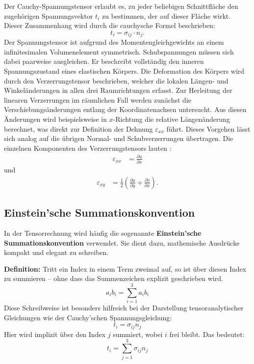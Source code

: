 Der Cauchy-Spannungstensor erlaubt es, zu jeder beliebigen Schnittfläche den zugehörigen Spannungsvektor $t_i$ zu bestimmen, der auf dieser Fläche wirkt.
Dieser Zusammenhang wird durch die cauchysche Formel beschrieben:
	\begin{equation}
		t_i = 
		\sigma_{ij} \cdot n_j.
	\end{equation}
Der Spannungstensor ist aufgrund des Momentengleichgewichts an einem infinitesimalen Volumenelement symmetrisch. 
Schubspannungen müssen sich dabei paarweise ausgleichen. 
Er beschreibt vollständig den inneren Spannungszustand eines elastischen Körpers.
Die Deformation des Körpers wird durch den Verzerrungstensor beschrieben, welcher die lokalen Längen- und Winkeländerungen in allen drei Raumrichtungen erfasst.
Zur Herleitung der linearen Verzerrungen im räumlichen Fall werden zunächst die Verschiebungsänderungen entlang der Koordinatenachsen untersucht. 
Aus diesen Änderungen wird beispielsweise in $x$-Richtung die relative Längenänderung berechnet, was direkt zur Definition der Dehnung $\varepsilon_{xx}$ führt. 
Dieses Vorgehen lässt sich analog auf die übrigen Normal- und Schubverzerrungen übertragen.
Die einzelnen Komponenten des Verzerrungstensors lauten \cite{elastomechanik:Technische_Mechanik_2:Elastostatik}:
\begin{align}
	\varepsilon_{xx} &=
	\frac{\partial u}{\partial x}
\end{align}
und
\begin{align}
	\varepsilon_{xy} &=
	\frac{1}{2} \left( \frac{\partial u}{\partial y} + \frac{\partial v}{\partial x} \right).
\end{align}

\subsection{Einstein’sche Summationskonvention}
In der Tensorrechnung wird häufig die sogenannte \textbf{Einstein’sche Summationskonvention} verwendet. Sie dient dazu, mathemische Ausdrücke kompakt und elegant zu schreiben.

\medskip
\textbf{Definition:} Tritt ein Index in einem Term zweimal auf, so ist über diesen Index zu summieren – ohne dass das Summenzeichen explizit geschrieben wird.
	\begin{equation}
		a_i b_i = 
		\sum_{i=1}^3 a_i b_i
	\end{equation}
Diese Schreibweise ist besonders hilfreich bei der Darstellung tensoranalytischer Gleichungen wie der Cauchy’schen Spannungsgleichung:
	\begin{equation}
		t_i = 
		\sigma_{ij} n_j
	\end{equation}
Hier wird implizit über den Index $j$ summiert, wobei $i$ frei bleibt. Das bedeutet:
	\begin{equation}
		t_i = 
		\sum_{j=1}^{3} \sigma_{ij} n_j
	\end{equation}


